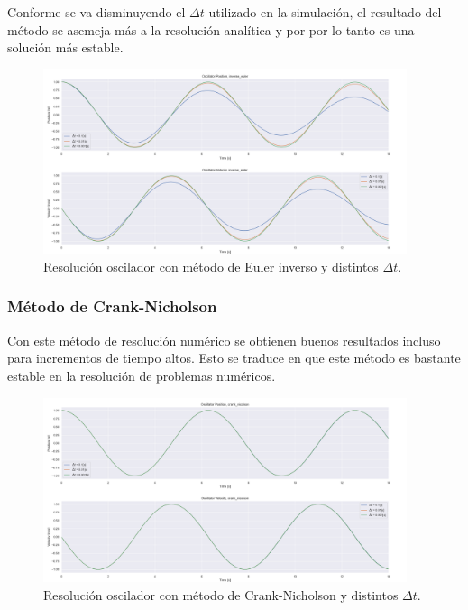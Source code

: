 \documentclass[12pt,a4paper]{article}
\begin{document}
Conforme se va disminuyendo el $\Delta t$ utilizado en la simulación, el resultado del método se asemeja más a la resolución analítica y por por lo tanto es una solución más estable.
\begin{figure}[H]
	\centering
	\includegraphics[width=0.95\textwidth]{FIGURES/mil4/osci_inveuler.png}
	\caption{Resolución oscilador con método de Euler inverso y distintos $\Delta t$.}
	\label{osci_inveuler}
\end{figure}


\subsubsection{Método de Crank-Nicholson}
Con este método de resolución numérico se obtienen buenos resultados incluso para incrementos de tiempo altos. Esto se traduce en que este método es bastante estable en la resolución de problemas numéricos.
\begin{figure}[H]
	\centering
	\includegraphics[width=0.95\textwidth]{FIGURES/mil4/osci_crank.png}
	\caption{Resolución oscilador con método de Crank-Nicholson y distintos $\Delta t$.}
	\label{osci_crank}
\end{figure}
\end{document}
